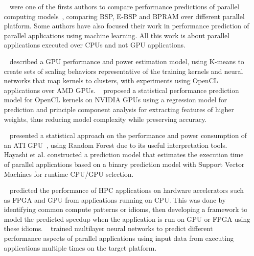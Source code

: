 ~\cite{Singh:2007:PPA} were one of the firsts authors to compare performance predictions of parallel computing models~\cite{Juurlink:1998}, comparing BSP, E-BSP and BPRAM over different parallel platform. Some authors have also focused their work in performance prediction of parallel applications using machine learning. All this work is about parallel applications executed over CPUs and not GPU applications.

~\cite{Greathouse:2015:GPGPUML} described a GPU performance and power estimation model, using K-means to create sets of scaling behaviors representative of the training kernels and neural networks that map kernels to clusters, with experiments using OpenCL applications over AMD GPUs. ~\cite{Karami:2013} proposed a statistical performance prediction model for OpenCL kernels on NVIDIA GPUs using a regression model for prediction and principle component analysis for extracting features of higher weights, thus reducing model complexity while preserving accuracy. 

~\cite{Hayashi:2015:MPH} presented  a statistical approach on  the  performance and power consumption of an ATI GPU~\cite{Zhang:2011}, using Random Forest due to its useful interpretation tools. Hayashi et al. constructed a prediction model that estimates the execution time of parallel applications based on a binary prediction model with Support Vector Machines for runtime CPU/GPU selection. 

~\cite{meswani:IPDPSW:2012} predicted the performance of HPC applications on hardware accelerators such as FPGA and GPU from applications running on CPU. This was done by identifying common compute patterns or idioms, then developing a framework to model the predicted speedup when the application is run on GPU or FPGA using these idioms. ~\cite{Ipek:2005:APP} trained multilayer neural networks to predict different performance aspects of parallel applications using input data from executing applications multiple times on the target platform.

